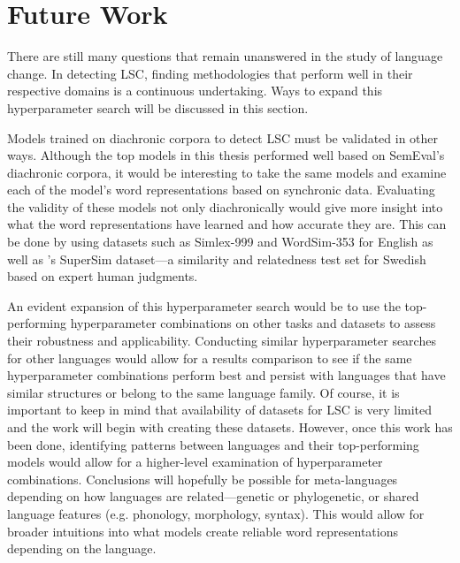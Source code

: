 \section{Future Work}
\label{sec:futurework}

There are still many questions that remain unanswered in the study of language change. In detecting LSC, finding methodologies that perform well in their respective domains is a continuous undertaking. Ways to expand this hyperparameter search will be discussed in this section.

Models trained on diachronic corpora to detect LSC must be validated in other ways. Although the top models in this thesis performed well based on SemEval’s diachronic corpora, it would be interesting to take the same models and examine each of the model’s word representations based on synchronic data. Evaluating the validity of these models not only diachronically would give more insight into what the word representations have learned and how accurate they are. This can be done by using datasets such as Simlex-999 \citep{hill-reichart-simlex999} and WordSim-353 \citep{finkelstein-wordsim2001} for English as well as \citet{supersim2021}'s SuperSim dataset—a similarity and relatedness test set for Swedish based on expert human judgments. 

An evident expansion of this hyperparameter search would be to use the top-performing hyperparameter combinations on other tasks and datasets to assess their robustness and applicability. Conducting similar hyperparameter searches for other languages would allow for a results comparison to see if the same hyperparameter combinations perform best and persist with languages that have similar structures or belong to the same language family. Of course, it is important to keep in mind that availability of datasets for LSC is very limited and the work will begin with creating these datasets. However, once this work has been done, identifying patterns between languages and their top-performing models would allow for a higher-level examination of hyperparameter combinations. Conclusions will hopefully be possible for meta-languages depending on how languages are related—genetic or phylogenetic, or shared language features (e.g. phonology, morphology, syntax). This would allow for broader intuitions into what models create reliable word representations depending on the language.

